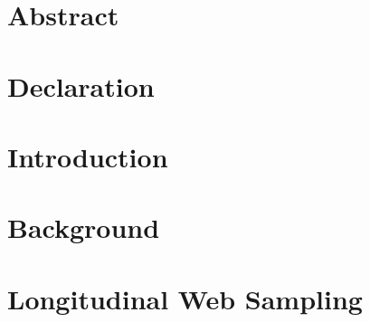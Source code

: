 \documentclass[10pt,oneside,a4paper,onecolumn,titlepage,draft]{lancsthesis}
\begin{document}
\frontmatter








\chapter*{Abstract}




\chapter*{Declaration}


\tableofcontents
\listoffigures
\listoftables
\clearpage



\mainmatter


\chapter{Introduction}
\label{sec:introduction}




\chapter{Background}
\label{sec:litreview}



\chapter{Longitudinal Web Sampling}
\label{sec:longitudinal}

\end{document}
